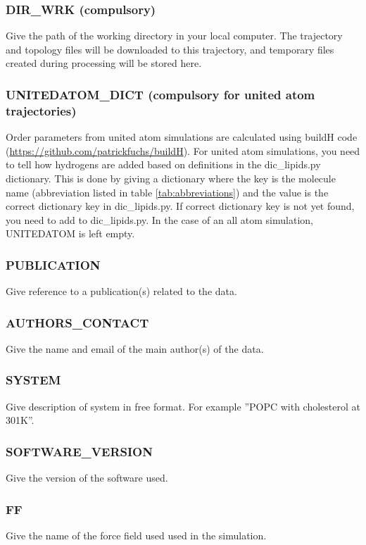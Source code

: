 \documentclass[fleqn,10pt]{wlscirep}
\begin{document}
\subsubsection*{DIR\_WRK (compulsory)}
Give the path of the working directory in your local computer. The trajectory and topology files will be downloaded to this trajectory, and temporary files created during processing will be stored here. 


\subsubsection*{UNITEDATOM\_DICT (compulsory for united atom trajectories)}
Order parameters from united atom simulations are calculated using buildH code (\url{https://github.com/patrickfuchs/buildH}). For united atom simulations, you need to tell how hydrogens are added based on definitions in the dic\_lipids.py dictionary. This is done by giving a dictionary where the key is the molecule name (abbreviation listed in table \ref{tab:abbreviations}) and the value is the correct dictionary key in dic\_lipids.py. If correct dictionary key is not yet found, you need to add to dic\_lipids.py. 
In the case of an all atom simulation, UNITEDATOM is left empty.


\subsubsection*{PUBLICATION}
Give reference to a publication(s) related to the data.

\subsubsection*{AUTHORS\_CONTACT}
Give the name and email of the main author(s) of the data.

\subsubsection*{SYSTEM}
Give description of system in free format. For example ''POPC with cholesterol at 301K''.


\subsubsection*{SOFTWARE\_VERSION}
Give the version of the software used.

\subsubsection*{FF}
Give the name of the force field used used in the simulation.
\end{document}
